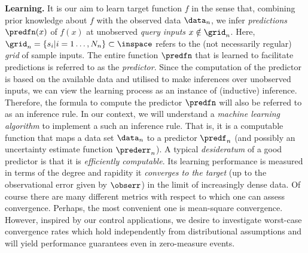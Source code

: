 \textbf{Learning.}
It is our aim to learn target function $f$ in the sense that, combining prior knowledge about $f$ with the observed data $\data_n$, we infer \textit{predictions} $\predfn(x)$ of $f(x)$ at unobserved \textit{query inputs} $x \notin \grid_n$. Here, $\grid_n =\{s_i | i =1\ldots,N_n\} \subset \inspace$ refers to the (not necessarily regular) \emph{grid} of sample inputs. The entire function $\predfn$ that is learned to facilitate predictions is referred to as the \textit{predictor}. Since the computation of the predictor is based on the available data and utilised to make inferences over unobserved inputs, we can view the learning process as an instance of (inductive) inference. Therefore, the formula to compute the predictor $\predfn$ will also be referred to as an inference rule.
%
%
In our context, we will understand a \textit{machine learning algorithm} to implement a such an inference rule. That is, it is a computable function that maps a data set $\data_n $ to a 
 predictor $\predf_n$ (and possibly an uncertainty estimate function $\prederr_n$). 
A typical \textit{desideratum} of a good predictor is that it is \textit{efficiently computable}. Its learning performance is measured in terms of the degree and rapidity it  \textit{converges to the target} (up to the observational error given by $\obserr$) in the limit of increasingly dense data. Of course there are many different metrics with respect to which one can assess convergence. Perhaps, the most convenient one is mean-square convergence. However, inspired by our control applications, we desire to investigate worst-case convergence rates which hold independently from distributional assumptions and will yield performance guarantees even in zero-measure events.


